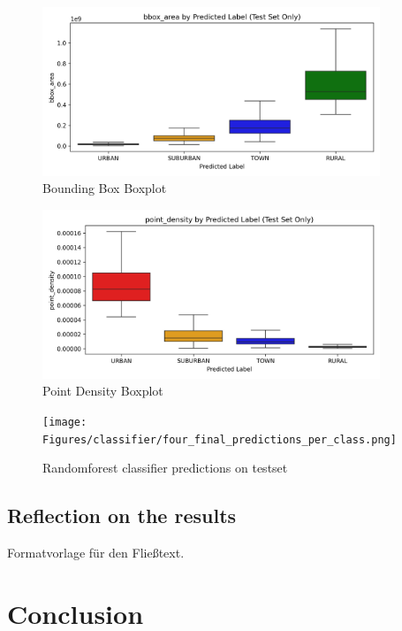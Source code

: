 \documentclass[a4paper,12pt,twoside]{scrreprt}
\begin{document}
\begin{figure}[htbp]
  \centering

  \includegraphics[width=0.9\textwidth]{Figures/classifier/boxplots/classifier_bbox_area_boxplot.png}
  \caption{Bounding Box Boxplot}
  \label{fig:bbox_boxplot_classifier}
\end{figure}
\FloatBarrier
\begin{figure}[htbp]
  \centering

  \includegraphics[width=0.9\textwidth]{Figures/classifier/boxplots/classifier_point_density_boxplot.png}
  \caption{Point Density Boxplot}
  \label{fig:point_density_boxplot_classifier}
\end{figure}
\FloatBarrier

\begin{figure}[htbp]
  \centering

  \texttt{[image: Figures/classifier/four\_final\_predictions\_per\_class.png]}
  \caption{Randomforest classifier predictions on testset}
  \label{fig:four_final_predictions_on_testset}
\end{figure}
\FloatBarrier
\section{Reflection on the results}
Formatvorlage für den Fließtext.

\chapter{Conclusion}
\end{document}
